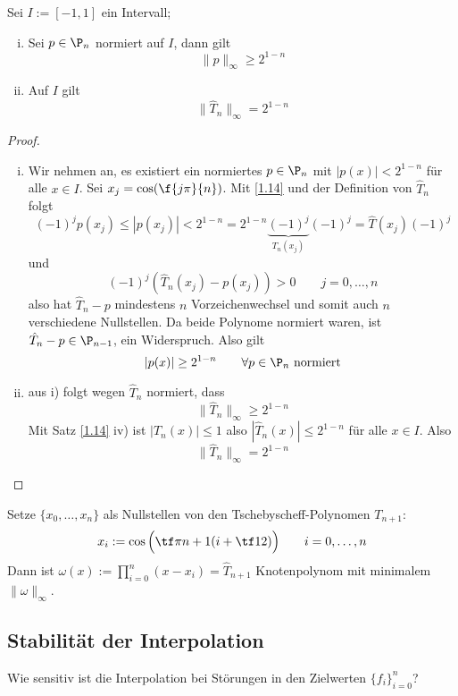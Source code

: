 \documentclass[11pt]{scrbook}
\begin{document}
\begin{st}[Optimalität]
	\label{1.15}
	Sei $I := [-1,1]$ ein Intervall;
	\begin{enumerate}[i)]
		\item 
			Sei $p\in \P_n$ normiert auf $I$, dann gilt
			\[
				\|p\|_\infty \ge 2^{1-n}
			\]
		\item
			Auf $I$ gilt
			\[
				\displaystyle \|\hat T_n \|_\infty = 2^{1-n}
			\]
	\end{enumerate}
	\begin{proof}
		\begin{enumerate}[i)]
			\item 
				Wir nehmen an, es existiert ein normiertes $p\in \P_n$ mit $|p(x)|<2^{1-n}$ für alle $x\in I$.
				Sei $x_j= \cos(\f {j\pi}{n})$.
				Mit \ref{1.14} und der Definition von $\hat T_n$ folgt
				\[
					(-1)^j p(x_j) \le |p(x_j)| < 2^{1-n} = 2^{1-n}\underbrace{(-1)^j}_{T_n(x_j)}(-1)^j = \hat T(x_j)(-1)^j
				\]
				und
				\[
					(-1)^j(\hat T_n(x_j)-p(x_j)) > 0 \qquad j=0,\dotsc,n
				\]
				also hat $\hat T_n -p$ mindestens $n$ Vorzeichenwechsel und somit auch $n$ verschiedene Nullstellen. 
				Da beide Polynome normiert waren, ist $\hat T_n-p\in \P_{n-1}$, ein Widerspruch.
				Also gilt
				\[
					|p(x)| \ge 2^{1-n} \qquad \forall p\in \P_n \text{ normiert}
				\]
			\item
				aus i) folgt wegen $\hat T_n$ normiert, dass
				\[
					\|\hat T_n\|_\infty \ge 2^{1-n}
				\]
				Mit Satz \ref{1.14} iv) ist $|T_n(x)| \le 1$ also $|\hat T_n(x)| \le 2^{1-n}$ für alle $x\in I$.
				Also 
				\[
					\|\hat T_n\|_\infty = 2^{1-n}
				\]
		\end{enumerate}
	\end{proof}
\end{st}

\begin{kor}
	\label{1.16}
	Setze $\{x_0,\dotsc,x_n\}$ als Nullstellen von den Tschebyscheff-Polynomen $T_{n+1}$:
	\[
		x_i := \cos\Big(\tf \pi{n+1}(i + \tf 12)\Big) \qquad i=0,\dotsc,n
	\]
	Dann ist $\omega(x) := \prod_{i=0}^n (x-x_i) = \hat T_{n+1}$ Knotenpolynom mit minimalem $\|\omega\|_\infty$.
\end{kor}


\subsection{Stabilität der Interpolation}


Wie sensitiv ist die Interpolation bei Störungen in den Zielwerten $\{f_i\}_{i=0}^n$?
\end{document}
